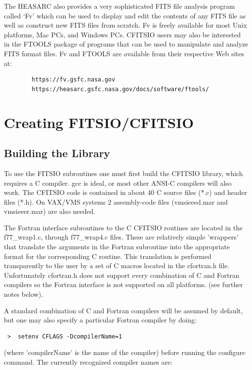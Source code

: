 \documentclass[11pt]{book}
\begin{document}
The HEASARC also provides a very sophisticated FITS file analysis
program called `Fv' which can be used to display and edit the contents
of any FITS file as well as construct new FITS files from scratch.
Fv is freely available for
most Unix platforms, Mac PCs, and Windows PCs.
CFITSIO users may also be interested in the FTOOLS package of programs
that can be used to manipulate and analyze FITS format files.
Fv and FTOOLS are available from their respective Web sites at:

\begin{verbatim}
        https://fv.gsfc.nasa.gov
        https://heasarc.gsfc.nasa.gov/docs/software/ftools/
\end{verbatim}


\chapter{ Creating FITSIO/CFITSIO }


\section{Building the Library}

To use the FITSIO subroutines one must first build the CFITSIO library,
which requires a C compiler. gcc is ideal, or most other ANSI-C
compilers will also work.  The CFITSIO code is contained in about 40 C
source files (*.c) and header files (*.h). On VAX/VMS systems 2
assembly-code files (vmsieeed.mar and vmsieeer.mar) are also needed.

The Fortran interface subroutines to the C CFITSIO routines are located
in the f77\_wrap1.c, through f77\_wrap4.c files.  These are relatively simple
'wrappers' that translate the arguments in the Fortran subroutine into
the appropriate format for the corresponding C routine.  This
translation is performed transparently to the user by a set of C macros
located in the cfortran.h file.  Unfortunately cfortran.h does not
support every combination of C and Fortran compilers so the Fortran
interface is not supported on all platforms. (see further notes below).

A standard combination of C and Fortran compilers will be assumed by
default, but one may also specify a particular Fortran compiler by
doing:

\begin{verbatim}
 >  setenv CFLAGS -DcompilerName=1
\end{verbatim}
(where 'compilerName' is the name of the compiler) before running
the configure command.  The currently recognized compiler
names are:
\end{document}
